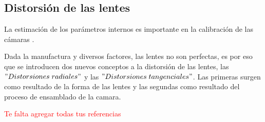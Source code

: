\documentclass{book}
\begin{document}
\subsection{Distorsión de las lentes}
La estimación de los parámetros internos es importante en la calibración de las cámaras \cite{weng1992camera}.


Dada la manufactura y diversos factores, las lentes no son perfectas, es por eso que se introducen dos nuevos conceptos a la distorsión de las lentes, las $"Distorsiones\;radiales"$ y las $"Distorsiones\;tangenciales"$. Las primeras surgen como resultado de la forma de las lentes y las segundas como resultado del proceso de ensamblado de la camara.

\textcolor{red}{Te falta agregar todas tus referencias}
%


\end{document}
